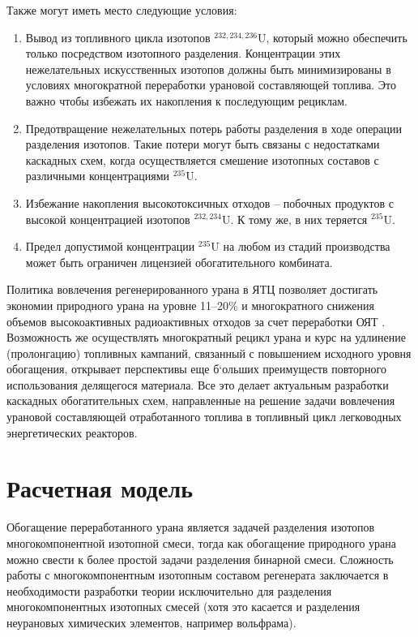 Также могут иметь место следующие условия:
\begin{enumerate}
  \item Вывод из топливного цикла изотопов $^{232,234,236}$U, который можно обеспечить только посредством изотопного разделения. Концентрации этих нежелательных искусственных изотопов должны быть минимизированы в условиях многократной переработки урановой составляющей топлива. Это важно чтобы избежать их накопления к последующим рециклам.
  \item Предотвращение нежелательных потерь работы разделения в ходе операции разделения изотопов. Такие потери могут быть связаны с недостатками каскадных схем, когда осуществляется смешение изотопных составов с различными концентрациями $^{235}$U. 
  \item Избежание накопления высокотоксичных отходов -- побочных продуктов с высокой концентрацией изотопов $^{232,234}$U. К тому же, в них теряется $^{235}$U.
  \item Предел допустимой концентрации $^{235}$U на любом из стадий производства может быть ограничен лицензией обогатительного комбината.
\end{enumerate}

Политика вовлечения регенерированного урана в ЯТЦ позволяет достигать экономии природного урана на уровне 11--20\% и многократного снижения объемов высокоактивных радиоактивных отходов за счет переработки ОЯТ \cite{delculAnalysisReuseUranium2009}. Возможность же осуществлять многократный рецикл урана и курс на удлинение (пролонгацию) топливных кампаний, связанный с повышением исходного уровня обогащения, открывает перспективы еще б`ольших преимуществ повторного использования делящегося материала.
Все это делает актуальным разработки каскадных обогатительных схем, направленные на решение задачи вовлечения урановой составляющей отработанного топлива в топливный цикл легководных энергетических реакторов.

\section{Расчетная модель}

Обогащение переработанного урана является задачей разделения изотопов многокомпонентной изотопной смеси, тогда как обогащение природного урана можно свести к более простой задачи разделения бинарной смеси. Сложность работы с многокомпонентным изотопным составом регенерата заключается в необходимости разработки теории исключительно для разделения многокомпонентных изотопных смесей (хотя это касается и разделения неурановых химических элементов, например вольфрама).


